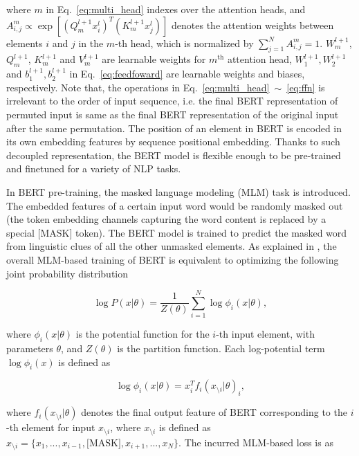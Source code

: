 where $m$ in Eq.~\ref{eq:multi_head}  indexes over the attention heads, and $A^{m}_{i,j} \propto \exp[(Q_m^{l+1} x^l_i)^T (K_m^{l+1} x^l_j)]$ denotes the attention weights between elements $i$ and $j$ in the $m$-th head, which is normalized by $\sum_{j=1}^{N}A^{m}_{i,j} = 1$. $W^{l+1}_m$, $Q^{l+1}_m$, $K^{l+1}_m$ and $V^{l+1}_m$ are learnable weights for $m^\text{th}$ attention head, $W_1^{l+1}, W_2^{l+1}$ and $b_1^{l+1}, b_2^{l+1}$ in Eq.~\ref{eq:feedfoward} are learnable weights and biases, respectively. Note that, the operations in Eq.~\ref{eq:multi_head}~$\sim$~\ref{eq:ffn} is irrelevant to the order of input sequence, i.e. the final BERT representation of permuted input is same as the final BERT representation of the original input after the same permutation. The position of an element in BERT is encoded in its own embedding features by sequence positional embedding. Thanks to such decoupled representation, the BERT model is flexible enough to be pre-trained and finetuned for a variety of NLP tasks.

In BERT pre-training, the masked language modeling (MLM) task is introduced. The embedded features of a certain input word would be randomly masked out (the token embedding channels capturing the word content is replaced by a special [MASK] token). The BERT model is trained to predict the masked word from linguistic clues of all the other unmasked elements. As explained in \cite{wang2019bertmrf}, the overall MLM-based training of BERT is equivalent to optimizing the following joint probability distribution

\begin{equation}
\log P(x|\theta) = \frac{1}{Z(\theta)}\sum_{i=1}^{N} \log \phi_i (x|\theta),
\label{eq:bert_as_mrf}
\end{equation}

where $\phi_i (x|\theta)$ is the potential function for the $i$-th input element, with parameters $\theta$, and $Z(\theta)$ is the partition function. Each log-potential term $\log \phi_i (x)$ is defined as

\begin{equation}
\log \phi_i (x|\theta) = x_i^T f_i(x_{\setminus i} | \theta)_i,
\end{equation}

where $f_i(x_{\setminus i} | \theta)$ denotes the final output feature of BERT corresponding to the $i$-th element for input $x_{\setminus i}$, where $x_{\setminus i}$ is defined as $x_{\setminus i} = \{x_1, ..., x_{i-1}, \text{[MASK]}, x_{i+1}, ..., x_{N}\}$. The incurred MLM-based loss is as

